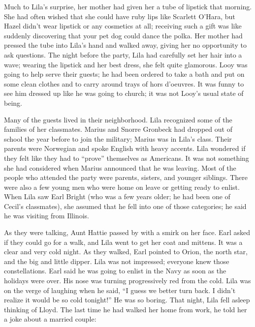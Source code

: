 \documentclass[
  letterpaper,
]{book}
\begin{document}
Much to Lila's surprise, her mother had given her a tube of lipstick
that morning. She had often wished that she could have ruby lips like
Scarlett O'Hara, but Hazel didn't wear lipstick or any cosmetics at all;
receiving such a gift was like suddenly discovering that your pet dog
could dance the polka. Her mother had pressed the tube into Lila's hand
and walked away, giving her no opportunity to ask questions. The night
before the party, Lila had carefully set her hair into a wave; wearing
the lipstick and her best dress, she felt quite glamorous. Looy was
going to help serve their guests; he had been ordered to take a bath and
put on some clean clothes and to carry around trays of hors d'oeuvres.
It was funny to see him dressed up like he was going to church; it was
not Looy's usual state of being.

Many of the guests lived in their neighborhood. Lila recognized some of
the families of her classmates. Marius and Snorre Gronbeck had dropped
out of school the year before to join the military; Marius was in Lila's
class. Their parents were Norwegian and spoke English with heavy
accents. Lila wondered if they felt like they had to ``prove''
themselves as Americans. It was not something she had considered when
Marius announced that he was leaving. Most of the people who attended
the party were parents, sisters, and younger siblings. There were also a
few young men who were home on leave or getting ready to enlist. When
Lila saw Earl Bright (who was a few years older; he had been one of
Cecil's classmates), she assumed that he fell into one of those
categories; he said he was visiting from Illinois.

As they were talking, Aunt Hattie passed by with a smirk on her face.
Earl asked if they could go for a walk, and Lila went to get her coat
and mittens. It was a clear and very cold night. As they walked, Earl
pointed to Orion, the north star, and the big and little dipper. Lila
was not impressed; everyone knew those constellations. Earl said he was
going to enlist in the Navy as soon as the holidays were over. His nose
was turning progressively red from the cold. Lila was on the verge of
laughing when he said, ``I guess we better turn back. I didn't realize
it would be so cold tonight!'' He was so boring. That night, Lila fell
asleep thinking of Lloyd. The last time he had walked her home from
work, he told her a joke about a married couple:
\end{document}
